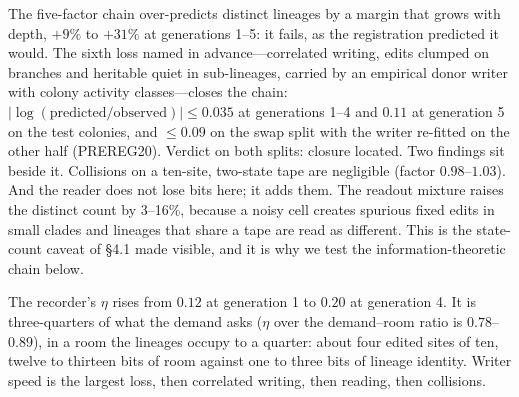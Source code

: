 \documentclass[11pt]{article}
\begin{document}
The five-factor chain over-predicts distinct lineages by a margin that grows with depth, $+9\%$ to $+31\%$ at generations 1--5: it fails, as the registration predicted it would. The sixth loss named in advance---correlated writing, edits clumped on branches and heritable quiet in sub-lineages, carried by an empirical donor writer with colony activity classes---closes the chain: $|\log(\text{predicted}/\text{observed})|\le0.035$ at generations 1--4 and $0.11$ at generation 5 on the test colonies, and $\le0.09$ on the swap split with the writer re-fitted on the other half (PREREG20). Verdict on both splits: closure located. Two findings sit beside it. Collisions on a ten-site, two-state tape are negligible (factor $0.98$--$1.03$). And the reader does not lose bits here; it adds them. The readout mixture raises the distinct count by 3--16\%, because a noisy cell creates spurious fixed edits in small clades and lineages that share a tape are read as different. This is the state-count caveat of \S4.1 made visible, and it is why we test the information-theoretic chain below.

The recorder's $\eta$ rises from $0.12$ at generation 1 to $0.20$ at generation 4. It is three-quarters of what the demand asks ($\eta$ over the demand--room ratio is $0.78$--$0.89$), in a room the lineages occupy to a quarter: about four edited sites of ten, twelve to thirteen bits of room against one to three bits of lineage identity. Writer speed is the largest loss, then correlated writing, then reading, then collisions.
\end{document}
